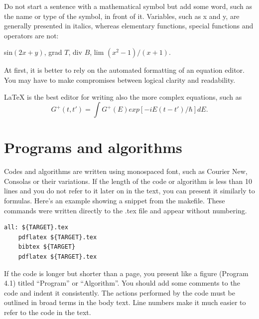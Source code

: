 \documentclass[12pt,a4paper,finnish]{tutthesis}
\begin{document}
Do not start a sentence with a mathematical symbol but add some word,
such as the name or type of the symbol, in front of it. Variables,
such as x and y, are generally presented in italics, whereas
elementary functions, special functions and operators are not:
\begin{center}
sin$(2x+y)$, 	grad $T$, 	div $B$, 	lim $(x^2 - 1)/(x + 1)$.
\end{center}

At first, it is better to rely on the automated formatting of an
equation editor. You may have to make compromises between logical
clarity and readability.


LaTeX is the best editor for writing also the more complex equations, such as
\begin{equation}
  \label{eq:fourier}
  G^+(t,t')= \int G^+(E) exp[-iE(t-t')/\hbar] dE.
\end{equation}




\section{Programs and algorithms}

Codes and algorithms are written using monospaced font, such as
Courier New, Consolas or their variations. If the length of the code
or algorithm is less than 10 lines and you do not refer to it later on
in the text, you can present it similarly to formulas.  Here's an
example showing a snippet from the makefile. These commands were
written directly to the .tex file and appear without numbering.

\begin{lstlisting}[style=console, % title={Template files}
  ] 
all: ${TARGET}.tex
	pdflatex ${TARGET}.tex
	bibtex ${TARGET}
	pdflatex ${TARGET}.tex
\end{lstlisting}  

If the code is longer but shorter than a page, you present like a
figure (Program 4.1) titled ``Program'' or ``Algorithm''.
You should add some comments to the code and indent it
consistently. The actions performed by the code must be outlined in
broad terms in the body text. Line numbers make it much easier to
refer to the code in the text. 
\end{document}
